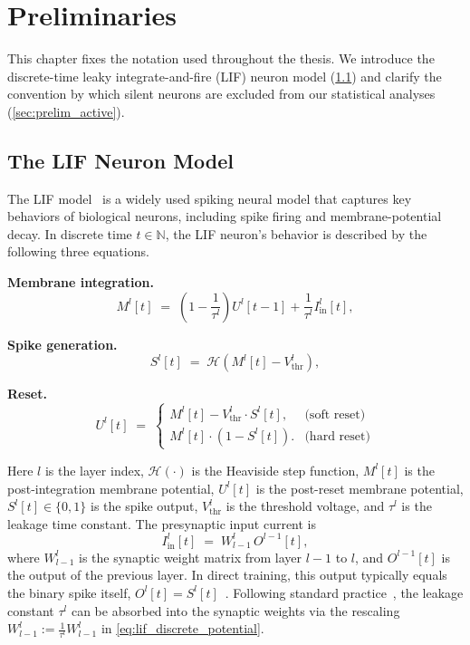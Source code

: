 \chapter{Preliminaries}
\label{ch:preliminaries}

This chapter fixes the notation used throughout the thesis. We introduce the discrete-time leaky integrate-and-fire (LIF) neuron model (\cref{sec:prelim_lif}) and clarify the convention by which silent neurons are excluded from our statistical analyses (\cref{sec:prelim_active}).

\section{The LIF Neuron Model}
\label{sec:prelim_lif}

The LIF model~\cite{eshraghian:2021} is a widely used spiking neural model that captures key behaviors of biological neurons, including spike firing and membrane-potential decay. In discrete time $t \in \mathbb{N}$, the LIF neuron's behavior is described by the following three equations.

\noindent\textbf{Membrane integration.}
\begin{equation}
\label{eq:lif_discrete_potential}
    M^{l}[t] \;=\; \left( 1 - \frac{1}{\tau^{l}} \right) U^{l}[t-1] + \frac{1}{\tau^{l}} I^{l}_{\text{in}}[t],
\end{equation}

\noindent\textbf{Spike generation.}
\begin{equation}
\label{eq:lif_discrete_firing}
    S^{l}[t] \;=\; \mathcal{H}\!\left( M^{l}[t] - V^{l}_{\text{thr}} \right),
\end{equation}

\noindent\textbf{Reset.}
\begin{equation}
\label{eq:lif_discrete_reset}
    U^{l}[t] \;=\; \begin{cases}
        M^{l}[t] - V^{l}_{\text{thr}} \cdot S^{l}[t], & \text{(soft reset)} \\
        M^{l}[t] \cdot (1 - S^{l}[t]). & \text{(hard reset)}
\end{cases}
\end{equation}

\noindent
Here $l$ is the layer index, $\mathcal{H}(\cdot)$ is the Heaviside step function, $M^{l}[t]$ is the post-integration membrane potential, $U^{l}[t]$ is the post-reset membrane potential, $S^{l}[t]\in\{0,1\}$ is the spike output, $V^{l}_{\text{thr}}$ is the threshold voltage, and $\tau^{l}$ is the leakage time constant. The presynaptic input current is
\[
I^{l}_{\text{in}}[t] \;=\; W_{l-1}^{l}\,O^{l-1}[t],
\]
where $W_{l-1}^{l}$ is the synaptic weight matrix from layer $l-1$ to $l$, and $O^{l-1}[t]$ is the output of the previous layer. In direct training, this output typically equals the binary spike itself, $O^{l}[t] = S^{l}[t]$~\cite{wu:2018}. Following standard practice~\cite{eshraghian:2021}, the leakage constant $\tau^{l}$ can be absorbed into the synaptic weights via the rescaling $W_{l-1}^{l} \!:=\! \tfrac{1}{\tau^{l}} W_{l-1}^{l}$ in \cref{eq:lif_discrete_potential}.

